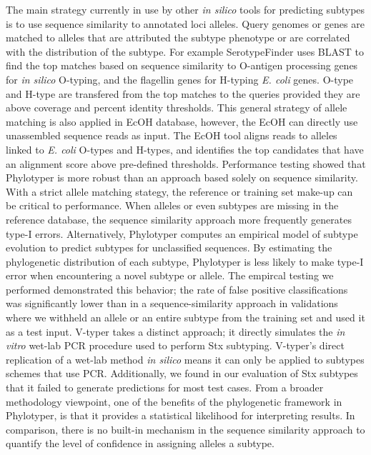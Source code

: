 \documentclass{bioinfo}
\begin{document}
The main strategy currently in use by other \textit{in silico} tools for predicting subtypes is to use sequence similarity to annotated loci alleles.
Query genomes or genes are matched to alleles that are attributed the subtype phenotype or are correlated with the distribution of the subtype.
For example SerotypeFinder uses BLAST to find the top matches based on sequence similarity to O-antigen processing genes for \textit{in silico} O-typing, and the flagellin genes for H-typing \textit{E. coli} genes.  
O-type and H-type are transfered from the top matches to the queries provided they are above coverage and percent identity thresholds.
This general strategy of allele matching is also applied in EcOH database, however, the EcOH can directly use unassembled sequence reads as input. The EcOH tool aligns reads to alleles linked to \textit{E. coli} O-types and H-types, and identifies the top candidates that have an alignment score above pre-defined thresholds.
Performance testing showed that Phylotyper is more robust than an approach based solely on sequence similarity.
With a strict allele matching stategy, the reference or training set make-up can be critical to performance.
When alleles or even subtypes are missing in the reference database, the sequence similarity approach more frequently generates type-I errors.
Alternatively, Phylotyper computes an empirical model of subtype evolution to predict subtypes for unclassified sequences.
By estimating the phylogenetic distribution of each subtype, Phylotyper is less likely to make type-I error when encountering a novel subtype or allele. 
The empircal testing we performed demonstrated this behavior; 
the rate of false positive classifications was significantly lower than in a sequence-similarity approach in validations where we withheld an allele or an entire subtype from the training set and used it as a test input.
V-typer takes a distinct approach; it directly simulates the \textit{in vitro} wet-lab PCR procedure used to perform Stx subtyping. 
V-typer's direct replication of a wet-lab method \textit{in silico} means it can only be applied to subtypes schemes that use PCR. 
Additionally, we found in our evaluation of Stx subtypes that it failed to generate predictions for most test cases.
From a broader methodology viewpoint, one of the benefits of the phylogenetic framework in Phylotyper, is that it provides a statistical likelihood for interpreting results.
In comparison, there is no built-in mechanism in the sequence similarity approach to quantify the level of confidence in assigning alleles a subtype.
\end{document}
